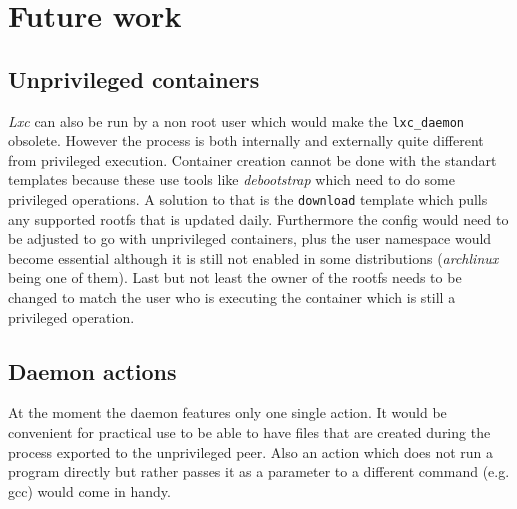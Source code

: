 \chapter{Future work}

\section{Unprivileged containers}

\textit{Lxc} can also be run by a non root user which would make the \texttt{lxc\_daemon} obsolete.
However the process is both internally and externally quite different from privileged execution.
Container creation cannot be done with the standart templates because these use tools like
\textit{debootstrap} which need to do some privileged operations. A solution to that is the \texttt{download} template
which pulls any supported rootfs that is updated daily. Furthermore the config would need to
be adjusted to go with unprivileged containers, plus the user namespace would become essential
although it is still not enabled in some distributions (\textit{archlinux} being one of them).
Last but not least the owner of the rootfs needs to be changed to match the user who is executing
the container which is still a privileged operation.

\section{Daemon actions}

At the moment the daemon features only one single action. It would be convenient for practical use
to be able to have files that are created during the process exported to the unprivileged peer.
Also an action which does not run a program directly but rather passes it as a parameter to a different
command (e.g. gcc) would come in handy.